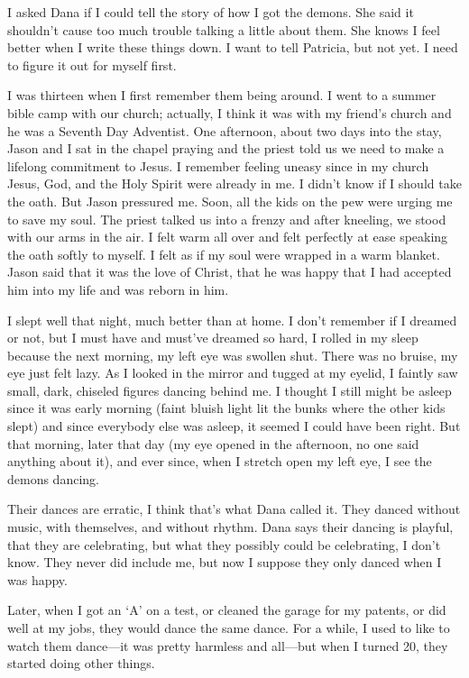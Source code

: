 I asked Dana if I could tell the story of how I got the demons. She said
it shouldn't cause too much trouble talking a little about them. She
knows I feel better when I write these things down. I want to tell
Patricia, but not yet. I need to figure it out for myself first.

I was thirteen when I first remember them being around. I went to a
summer bible camp with our church; actually, I think it was with my
friend's church and he was a Seventh Day Adventist. One afternoon, about
two days into the stay, Jason and I sat in the chapel praying and the
priest told us we need to make a lifelong commitment to Jesus. I
remember feeling uneasy since in my church Jesus, God, and the Holy
Spirit were already in me. I didn't know if I should take the oath. But
Jason pressured me. Soon, all the kids on the pew were urging me to save
my soul. The priest talked us into a frenzy and after kneeling, we stood
with our arms in the air. I felt warm all over and felt perfectly at
ease speaking the oath softly to myself. I felt as if my soul were
wrapped in a warm blanket. Jason said that it was the love of Christ,
that he was happy that I had accepted him into my life and was reborn in
him.

I slept well that night, much better than at home. I don't remember if I
dreamed or not, but I must have and must've dreamed so hard, I rolled in
my sleep because the next morning, my left eye was swollen shut. There
was no bruise, my eye just felt lazy. As I looked in the mirror and
tugged at my eyelid, I faintly saw small, dark, chiseled figures dancing
behind me. I thought I still might be asleep since it was early morning
(faint bluish light lit the bunks where the other kids slept) and since
everybody else was asleep, it seemed I could have been right. But that
morning, later that day (my eye opened in the afternoon, no one said
anything about it), and ever since, when I stretch open my left eye, I
see the demons dancing.

Their dances are erratic, I think that's what Dana called it. They
danced without music, with themselves, and without rhythm. Dana says
their dancing is playful, that they are celebrating, but what they
possibly could be celebrating, I don't know. They never did include me,
but now I suppose they only danced when I was happy.

Later, when I got an `A' on a test, or cleaned the garage for my
patents, or did well at my jobs, they would dance the same dance. For a
while, I used to like to watch them dance---it was pretty harmless and
all---but when I turned 20, they started doing other things.

